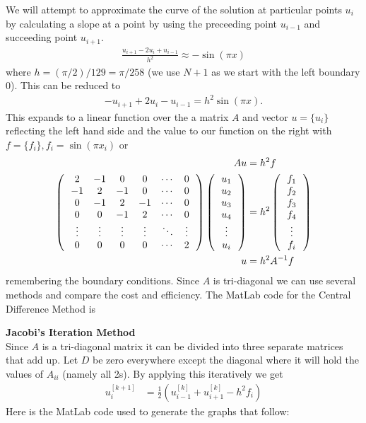 \documentclass[12pt,a4paper]{report}
\begin{document}
We will attempt to approximate the curve of  the solution at particular points $u_i$ by calculating a slope at a point by using the preceeding point $u_{i-1}$ and succeeding point $u_{i+1}$.  
\begin{align*}
	\frac{u_{i+1}-2u_i+u_{i-1}}{h^2} \approx -\sin (\pi x)
\end{align*}where $h=(\pi/2)/129=\pi/258$ (we use $N+1$ as we start with the left boundary 0).  This can be reduced to 
\begin{align*}
	-u_{i+1}+2u_i-u_{i-1} = h^2\sin (\pi x).
\end{align*}This expands to a linear function over the a matrix $A$ and vector $u=\{ u_i \}$ reflecting the left hand side and the value to our function on the right with $f=\{ f_i \}, f_i=\sin(\pi x_i)$ or
\begin{align*}
	Au &= h^2 f\\
	\left (\, \begin{array}{cccccc}
		2 & -1 & 0 & 0 &\cdots & 0\\
		-1 & 2 & -1 & 0 &\cdots & 0\\
		0 & -1 & 2 & -1 &\cdots & 0\\
		0 & 0 &-1 & 2 & \cdots & 0\\
		\vdots & \vdots & \vdots & \vdots &\ddots & \vdots\\
		0 & 0 & 0 & 0 & \cdots & 2
	\end{array}  \,\right ) \left (\, \begin{array}{c}  u_1 \\ u_2 \\ u_3 \\ u_4 \\ \vdots \\ u_i  \end{array}  \,\right ) &= h^2 \left (\, \begin{array}{c}  f_1 \\ f_2 \\ f_3 \\ f_4 \\ \vdots \\ f_i  \end{array}  \,\right ) \\
	u &= h^2 A^{-1} f
\end{align*}remembering the boundary conditions.  Since $A$ is tri-diagonal we can use several methods and compare the cost and efficiency.  The MatLab code for the Central Difference Method is
	

\noindent\textbf{Jacobi's Iteration Method}\\

Since $A$ is a tri-diagonal matrix it can be divided into three separate matrices that add up.  Let $D$ be zero everywhere except the diagonal where it will hold the values of $A_{ii}$ (namely all 2s).  By applying this iteratively we get
\begin{align*}
	u_i^{[k+1]} &= \frac{1}{2}(u_{i-1}^{[k]}+u_{i+1}^{[k]} - h^2 f_i)
\end{align*}Here is the MatLab code used to generate the graphs that follow:
	
	
\end{document}
